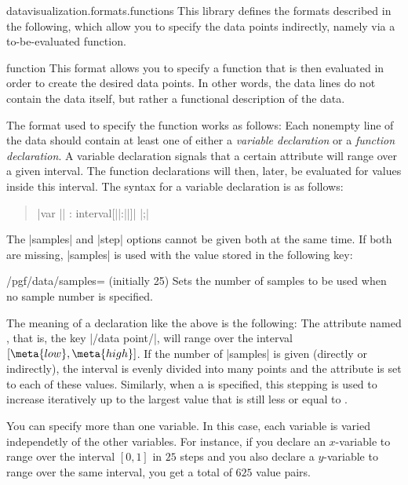 \begin{tikzlibrary}{datavisualization.formats.functions}
  This library defines the formats described in the following, which
  allow you to specify the data points indirectly, namely via a
  to-be-evaluated function. 
  
  \begin{dataformat}{function}
    This format allows you to specify a function that is then
    evaluated in order to create the desired data points. In other
    words, the data lines do not contain the data itself, but rather
    a functional description of the data.

    The format used to specify the function works as follows: Each
    nonempty line of the data should contain at least one of either a
    \emph{variable  declaration} or a \emph{function declaration}. A
    variable declaration signals that a certain attribute will range
    over a given interval. The function declarations will then, later,
    be evaluated for values inside this interval. The syntax for a
    variable declaration is as follows:
    \begin{quote}
      |var || : interval[||:||]|
       |;|
    \end{quote}
    The |samples| and |step| options cannot be given both at the same
    time. If both are missing, |samples| is used with the value stored
    in the following key:
    \begin{key}{/pgf/data/samples= (initially 25)}
      Sets the number of samples to be used when no sample number is
      specified. 
    \end{key}
    The meaning of a declaration like the above is the following: The
    attribute named , that is, the key
    |/data point/|, will range over the interval
    $[\meta{low},\meta{high}]$. If the number of |samples| is given
    (directly or indirectly), the interval is evenly divided into
     many points and the attribute is set to each of
    these values. Similarly, when a  is specified, this
    stepping is used to increase  iteratively up to the
    largest value that is still less or equal to .

    You can specify more than one variable. In this case, each
    variable is varied independetly of the other variables. For
    instance, if you declare an $x$-variable to range over the
    interval $[0,1]$ in $25$ steps and you also declare a $y$-variable
    to range over the same interval, you get a total of $625$ value
    pairs.


\end{dataformat}
\end{tikzlibrary}
